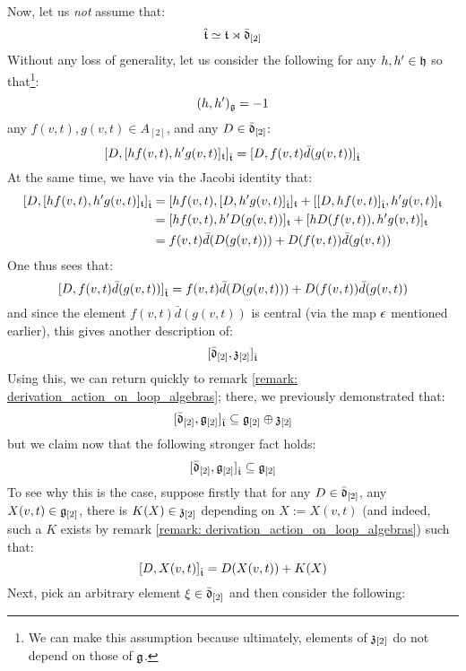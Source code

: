 \begin{remark}
                Now, let us \textit{not} assume that:
                    $$\hat{\mathfrak{t}} \simeq \mathfrak{t} \rtimes \bar{\mathfrak{d}}_{[2]}$$
                Without any loss of generality, let us consider the following for any $h, h' \in \mathfrak{h}$ so that\footnote{We can make this assumption because ultimately, elements of $\mathfrak{z}_{[2]}$ do not depend on those of $\mathfrak{g}$.}:
                    $$(h, h')_{\mathfrak{g}} = -1$$
                any $f(v, t), g(v, t) \in A_{[2]}$, and any $D \in \bar{\mathfrak{d}}_{[2]}$:
                    $$[ D, [h f(v, t), h' g(v, t)]_{\mathfrak{t}} ]_{\hat{\mathfrak{t}}} = [ D, f(v, t) \bar{d}( g(v, t) ) ]_{\hat{\mathfrak{t}}}$$
                At the same time, we have via the Jacobi identity that:
                    $$
                        \begin{aligned}
                            [ D, [h f(v, t), h' g(v, t)]_{\t} ]_{\hat{\t}} & = [ h f(v, t), [D, h' g(v, t)]_{\hat{\t}} ]_{\t} + [ [D, h f(v, t)]_{\hat{\t}}, h' g(v, t) ]_{\t}
                            \\
                            & = [ h f(v, t), h' D( g(v, t) ) ]_{\t} + [ h D( f(v, t) ), h' g(v, t) ]_{\t}
                            \\
                            & = f(v, t) \bar{d}( D( g(v, t) ) ) + D( f(v, t) ) \bar{d}(g(v, t))
                        \end{aligned}
                    $$
                One thus sees that:
                    $$[ D, f(v, t) \bar{d}( g(v, t) ) ]_{\hat{\mathfrak{t}}} = f(v, t) \bar{d}( D( g(v, t) ) ) + D( f(v, t) ) \bar{d}(g(v, t))$$
                and since the element $f(v, t) \bar{d}( g(v, t) )$ is central (via the map $\epsilon$ mentioned earlier), this gives another description of:
                    $$[ \bar{\mathfrak{d}}_{[2]}, \mathfrak{z}_{[2]} ]_{\hat{\mathfrak{t}}}$$
                Using this, we can return quickly to remark \ref{remark: derivation_action_on_loop_algebras}; there, we previously demonstrated that:
                    $$[ \bar{\mathfrak{d}}_{[2]}, \mathfrak{g}_{[2]} ]_{\hat{\mathfrak{t}}} \subseteq \mathfrak{g}_{[2]} \oplus \mathfrak{z}_{[2]}$$
                but we claim now that the following stronger fact holds:
                    $$[ \bar{\mathfrak{d}}_{[2]}, \mathfrak{g}_{[2]} ]_{\hat{\mathfrak{t}}} \subseteq \mathfrak{g}_{[2]}$$
                To see why this is the case, suppose firstly that for any $D \in \bar{\mathfrak{d}}_{[2]}$, any $X(v, t) \in \mathfrak{g}_{[2]}$, there is $K(X) \in \mathfrak{z}_{[2]}$ depending on $X := X(v, t)$ (and indeed, such a $K$ exists by remark \ref{remark: derivation_action_on_loop_algebras}) such that:
                    $$[ D, X(v, t) ]_{\hat{\mathfrak{t}}} = D( X(v, t) ) + K(X)$$
                Next, pick an arbitrary element $\xi \in \bar{\mathfrak{d}}_{[2]}$ and then consider the following:

\end{remark}
